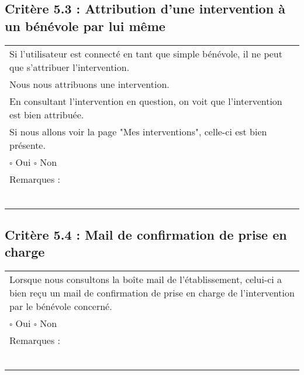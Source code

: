   	\subsection*{Critère 5.3 : Attribution d'une intervention à un bénévole par lui même}
  		\begin{center}
    	 		\begin{tabular}[h]{|p{}|}
			\hline
				Si l'utilisateur est connecté en tant que simple bénévole, il ne peut que s'attribuer l'intervention. \\
				Nous nous attribuons une intervention. \\
				En consultant l'intervention en question, on voit que l'intervention est bien attribuée. \\
				Si nous allons voir la page "Mes interventions", celle-ci est bien présente. \\
				
				$\square$ Oui  \hfill \hfill $\square$ Non \\\hline Remarques : \\ ~\\
			 \\\hline
     		\end{tabular}
  		\end{center}	
  		
  	\subsection*{Critère 5.4 : Mail de confirmation de prise en charge}
  		\begin{center}
    	 		\begin{tabular}[h]{|p{}|}
			\hline
				Lorsque nous consultons la boîte mail de l'établissement, celui-ci a bien reçu un mail de confirmation de prise en charge de l'intervention par le bénévole concerné.\\
				
				$\square$ Oui  \hfill \hfill $\square$ Non \\\hline Remarques : \\ ~\\
			 \\\hline
     		\end{tabular}
  		\end{center}	
  		
  		
